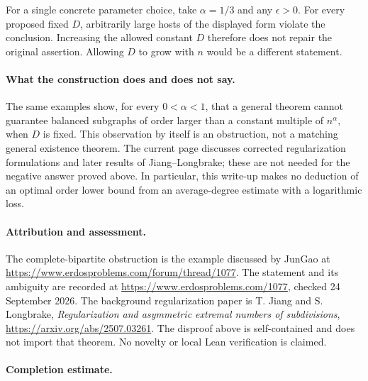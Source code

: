 For a single concrete parameter choice, take \(\alpha=1/3\) and any \(\epsilon>0\). For every proposed fixed \(D\), arbitrarily large hosts of the displayed form violate the conclusion. Increasing the allowed constant \(D\) therefore does not repair the original assertion. Allowing \(D\) to grow with \(n\) would be a different statement.

\paragraph{What the construction does and does not say.}
The same examples show, for every \(0<\alpha<1\), that a general theorem cannot guarantee balanced subgraphs of order larger than a constant multiple of \(n^\alpha\), when \(D\) is fixed. This observation by itself is an obstruction, not a matching general existence theorem.
The current page discusses corrected regularization formulations and later results of Jiang--Longbrake; these are not needed for the negative answer proved above. In particular, this write-up makes no deduction of an optimal order lower bound from an average-degree estimate with a logarithmic loss.

\paragraph{Attribution and assessment.}
The complete-bipartite obstruction is the example discussed by JunGao at \url{https://www.erdosproblems.com/forum/thread/1077}. The statement and its ambiguity are recorded at \url{https://www.erdosproblems.com/1077}, checked 24 September 2026. The background regularization paper is T. Jiang and S. Longbrake, \emph{Regularization and asymmetric extremal numbers of subdivisions}, \url{https://arxiv.org/abs/2507.03261}. The disproof above is self-contained and does not import that theorem. No novelty or local Lean verification is claimed.

\paragraph{Completion estimate.}
